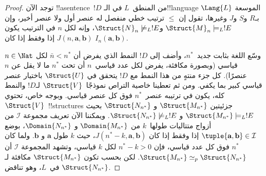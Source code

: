 \documentclass[../../../include/open-logic-section]{subfiles}
\begin{document}
\begin{proof}
توجد الآن !!a{sentence}~$!D$ من المنطق~$L$ في الـ!!{language}
$\Lang{L}$ الموسعة بـ$R$ و$S$ و$J$ وغيرها، تقول إن $\le$ ترتيب خطي
منفصل له عنصر أول ولا عنصر أخير، وإن
$\Struct{M}_n \models_L !E$ و$\Struct{N}_n \not\models_L !E$، وإنه لكل
$n$ في الترتيب يكون $J(n,\mathbf{a},\mathbf{b})$ إذا وفقط إذا كان
$I_n(\mathbf{a},\mathbf{b})$.

وسّع اللغة بثابت جديد~$n^*$، وأضف إلى $!D$ النمط الذي يفرض أن
$\bar n < n^*$ لكل $n \in \Nat$ قياسي (وبصورة مكافئة، يفرض لكل عدد
قياسي~$n$ أن تحت $n^*$ ما لا يقل عن $n$ عنصرًا). كل جزء منتهٍ من هذا
النمط مع $!D$ يتحقق في $\Struct{U}$ باختيار عنصر قياسي كبير بما يكفي.
ومن ثم تعطينا خاصية التراص نموذجًا~$\Struct{V}$ لـ$!D$ والنمط كله، يكون
في ترتيبه عنصر~$n^*$ فوق كل عنصر قياسي. وبوجه خاص، تحتوي
$\Struct{V}$~!!{structure}s جزئيتين $\Struct{M_{n^*}}$ و
$\Struct{N_{n^*}}$ بحيث $\Struct{M_{n^*}} \models_L !E$ و
$\Struct{N_{n^*}} \not\models_L !E$. ويمكننا الآن تعريف مجموعة
$\mathcal{I}$ من أزواج متتاليات طولها~$k$ من $\Domain{M_{n^*}}$ و
$\Domain{N_{n^*}}$، بوضع
$\tuple{\mathbf{a},\mathbf{b}} \in \mathcal{I}$ إذا وفقط إذا كان
$J(n^*-k,\mathbf{a},\mathbf{b})$، حيث $k$ طول $\mathbf{a}$ و
$\mathbf{b}$. ولما كان $n^*$ فوق كل عدد قياسي، فإن
$n^*-k>0$ لكل $k$ قياسي، وتشهد المجموعة $\mathcal{I}$ أن
$\Struct{M_{n^*}} \simeq_p \Struct{N_{n^*}}$. لكن بحسب
 تكون $\Struct{M_{n^*}}$ مكافئة لـ
$\Struct{N_{n^*}}$ في~$L$، وهو تناقض.
\end{proof}
\end{document}
